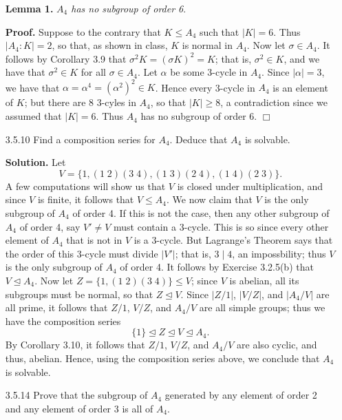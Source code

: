 \documentclass[9pt]{article}
\newcommand{\qed}{\hfill \ensuremath{\Box}}
\begin{document}
\begin{enumerate}
   \item[\textbf{Lemma 1.}] \textit{$A_4$ has no subgroup of order 6}.
   
   \textbf{Proof.} Suppose to the contrary that $K \le A_4$ such that $|K| = 6$.
   Thus $|A_4 : K| = 2$, so that, as shown in class, $K$ is normal in $A_4$. Now
   let $\sigma \in A_4$. It follows by Corollary 3.9 that
   $\sigma^2K = (\sigma K)^2 = K$; that is, $\sigma^2 \in K$, and we have that
   $\sigma^2 \in K$ for all $\sigma \in A_4$. Let $\alpha$ be some 3-cycle in
   $A_4$. Since $|\alpha| = 3$, we have that
   $\alpha = \alpha^4 = (\alpha^2)^2 \in K$. Hence every 3-cycle in $A_4$ is
   an element of $K$; but there are 8 3-cyles in $A_4$, so that $|K| \ge 8$,
   a contradiction since we assumed that $|K| = 6$. Thus $A_4$ has no subgroup
   of order 6. \qed
   \item[3.5.10]  Find a composition series for $A_4$. Deduce that $A_4$ is
                  solvable.
                  
      \textbf{Solution.} Let
      $$V = \{1, (1\;2)(3\;4), (1\;3)(2\;4), (1\;4)(2\;3)\}.$$
      A few computations will show us that $V$ is closed under multiplication,
      and since $V$ is finite, it follows that $V \le A_4$. We now claim that
      $V$ is the only subgroup of $A_4$ of order 4. If this is not the case,
      then any other subgroup of $A_4$ of order 4, say $V' \neq V$ must contain
      a 3-cycle. This is so since every other element of $A_4$ that is not in
      $V$ is a 3-cycle. But Lagrange's Theorem says that the order of this
      3-cycle must divide $|V'|$; that is, $3 \mid 4$, an impossbility; thus $V$
      is the only subgroup of $A_4$ of order 4. It follows by Exercise 3.2.5(b)
      that $V \trianglelefteq A_4$. Now let $Z = \{1, (1\;2)(3\;4)\} \le V$;
      since $V$ is abelian, all its subgroups must be normal, so that
      $Z \trianglelefteq V$. Since $|Z/{1}|$, $|V/Z|$, and $|A_4/V|$ are all
      prime, it follows that $Z/{1}$, $V/Z$, and $A_4/V$ are all simple groups;
      thus we have the composition series
      $$\{1\} \trianglelefteq Z \trianglelefteq V \trianglelefteq A_4.$$
      By Corollary 3.10, it follows that $Z/{1}$, $V/Z$, and $A_4/V$ are also
      cyclic, and thus, abelian. Hence, using the composition series above, we
      conclude that $A_4$ is solvable.
   \item[3.5.14]  Prove that the subgroup of $A_4$ generated by any element of
                  order 2 and any element of order 3 is all of $A_4$.
                  

\end{enumerate}
\end{document}
